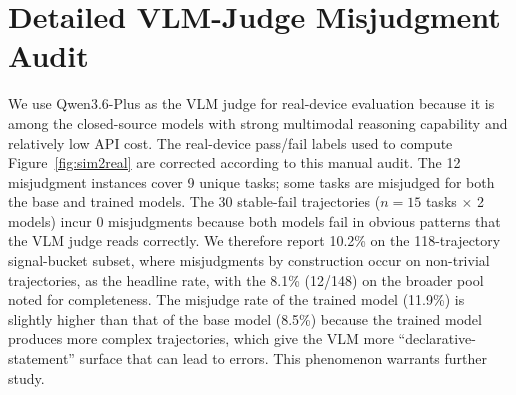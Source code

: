 \documentclass{llmxive}
\begin{document}
\section{Detailed VLM-Judge Misjudgment Audit}\label{app:vlm-audit}

\begin{table}[!htbp]
  \centering\small
  \setlength{\tabcolsep}{4pt}
  \caption{Manual review of real-device VLM-judge misjudgments on the 59-task signal-bucket subset (118 trajectories = 59 tasks $\times$ 2 models). The 30 stable-fail trajectories (15 tasks $\times$ 2 models) incur 0 misjudgments and are not included in the rate; including them would dilute the rate to 12/148 = 8.1\%.}
  \label{tab:vlm-judge}
\end{table}

We use Qwen3.6-Plus as the VLM judge for real-device evaluation because it is among the closed-source models with strong multimodal reasoning capability and relatively low API cost. The real-device pass/fail labels used to compute Figure~\ref{fig:sim2real} are corrected according to this manual audit. The 12 misjudgment instances cover 9 unique tasks; some tasks are misjudged for both the base and trained models. The 30 stable-fail trajectories ($n=15$ tasks $\times$ 2 models) incur 0 misjudgments because both models fail in obvious patterns that the VLM judge reads correctly. We therefore report 10.2\% on the 118-trajectory signal-bucket subset, where misjudgments by construction occur on non-trivial trajectories, as the headline rate, with the 8.1\% (12/148) on the broader pool noted for completeness. The misjudge rate of the trained model (11.9\%) is slightly higher than that of the base model (8.5\%) because the trained model produces more complex trajectories, which give the VLM more ``declarative-statement'' surface that can lead to errors. This phenomenon warrants further study.
\end{document}
